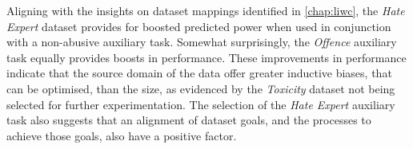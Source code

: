 Aligning with the insights on dataset mappings identified in \cref{chap:liwc}, the \textit{Hate Expert} dataset provides for boosted predicted power when used in conjunction with a non-abusive auxiliary task.
Somewhat surprisingly, the \textit{Offence} auxiliary task equally provides boosts in performance.
These improvements in performance indicate that the source domain of the data offer greater inductive biases, that can be optimised, than the size, as evidenced by the \textit{Toxicity} dataset not being selected for further experimentation.
The selection of the \textit{Hate Expert} auxiliary task also suggests that an alignment of dataset goals, and the processes to achieve those goals, also have a positive factor.

\begin{table}[]
  \centering
\end{table}
